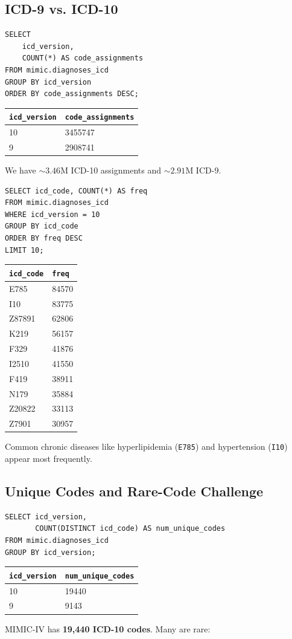 \documentclass[12pt,a4paper]{report}
\begin{document}
\subsection{ICD-9 vs. ICD-10}
\begin{verbatim}
SELECT
    icd_version,
    COUNT(*) AS code_assignments
FROM mimic.diagnoses_icd
GROUP BY icd_version
ORDER BY code_assignments DESC;
\end{verbatim}
\begin{center}
\begin{tabular}{l|l}
\hline
\texttt{icd\_version} & \texttt{code\_assignments} \\
\hline
10 & 3455747 \\
9  & 2908741 \\
\hline
\end{tabular}
\end{center}
We have \(\sim3.46\)M ICD-10 assignments and \(\sim2.91\)M ICD-9.

\begin{verbatim}
SELECT icd_code, COUNT(*) AS freq
FROM mimic.diagnoses_icd
WHERE icd_version = 10
GROUP BY icd_code
ORDER BY freq DESC
LIMIT 10;
\end{verbatim}
\begin{center}
\begin{tabular}{l|l}
\hline
\texttt{icd\_code} & \texttt{freq} \\
\hline
E785   & 84570  \\
I10    & 83775  \\
Z87891 & 62806  \\
K219   & 56157  \\
F329   & 41876  \\
I2510  & 41550  \\
F419   & 38911  \\
N179   & 35884  \\
Z20822 & 33113  \\
Z7901  & 30957  \\
\hline
\end{tabular}
\end{center}
Common chronic diseases like hyperlipidemia (\texttt{E785}) and hypertension (\texttt{I10}) appear most frequently.

\subsection{Unique Codes and Rare-Code Challenge}
\begin{verbatim}
SELECT icd_version,
       COUNT(DISTINCT icd_code) AS num_unique_codes
FROM mimic.diagnoses_icd
GROUP BY icd_version;
\end{verbatim}
\begin{center}
\begin{tabular}{l|l}
\hline
\texttt{icd\_version} & \texttt{num\_unique\_codes} \\
\hline
10 & 19440 \\
9  & 9143  \\
\hline
\end{tabular}
\end{center}
MIMIC-IV has \textbf{19,440 ICD-10 codes}. Many are rare:
\end{document}
